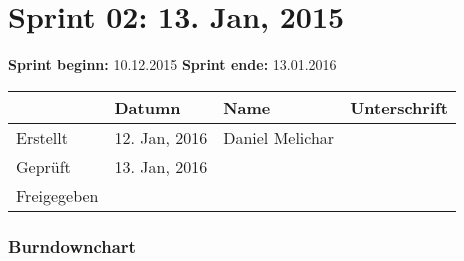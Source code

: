 \chapter{Sprint 02: 13. Jan, 2015}

\textbf{Sprint beginn:} 10.12.2015
\nextline
\textbf{Sprint ende:} 13.01.2016

\begin{tabular}{|l|l|l|l|l|l|}
            & Datumn        & Name            & \multicolumn{3}{l}{Unterschrift} \\ \hline
Erstellt    & 12. Jan, 2016 & Daniel Melichar & \multicolumn{3}{l}{}             \\ \hline
Geprüft     & 13. Jan, 2016 &                 & \multicolumn{3}{l}{}             \\ \hline
Freigegeben &               &                 & \multicolumn{3}{l}{}            
\end{tabular}

\subsection{Burndownchart}

